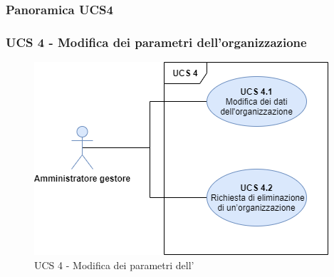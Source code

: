 \subsubsection{Panoramica UCS4}

\subsubsection{UCS 4 - Modifica dei parametri dell'organizzazione}%

\begin{figure}[h]
	\centering	
	\includegraphics[scale=0.53]{Sezioni/UseCase/Immagini/UCS4.png}
	\caption{UCS 4 - Modifica dei parametri dell'}
\end{figure}

